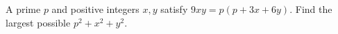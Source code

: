 A prime $p$ and positive integers $x,y$ satisfy $9xy=p(p+3x+6y)$. Find the largest possible $p^2+x^2+y^2$.
